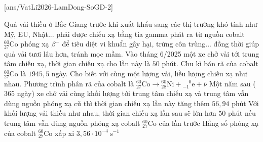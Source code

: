 	\subsection*{}
	\setcounter{ex}{0}
	[ans/VatLi2026-LamDong-SoGD-2]

	\begin{ex}%
		Quả vải thiều ở Bắc Giang trước khi xuất khẩu sang các thị trường khó tính như Mỹ, EU, Nhật... phải được chiếu xạ bằng tia gamma phát ra từ nguồn cobalt ${}^{60}_{27}\text{Co}$ phóng xạ $\beta^-$ để tiêu diệt vi khuẩn gây hại, trứng côn trùng... đồng thời giúp quả vải tươi lâu hơn, tránh mọc mầm. Vào tháng 6/2025 một xe chở vải tới trung tâm chiếu xạ, thời gian chiếu xạ cho lần này là $50$ phút. Chu kì bán rã của cobalt ${}^{60}_{27}\text{Co}$ là $1945{,}5$ ngày. Cho biết với cùng một lượng vải, liều lượng chiếu xạ như nhau.
		\choiceTFt
		{\True Phương trình phân rã của cobalt là ${}^{60}_{27}\text{Co}\to{}^{60}_{28}\text{Ni}+{}^{\phantom{-}0}_{-1}\text{e}+\overline{\nu}$}
		{Một năm sau ($365$ ngày) xe chở vải cùng khối lượng tới trung tâm chiếu xạ và trung tâm vẫn dùng nguồn phóng xạ cũ thì thời gian chiếu xạ lần này tăng thêm $56{,}94$ phút}
		{\True Với khối lượng vải thiều như nhau, thời gian chiếu xạ lần sau sẽ lớn hơn $50$ phút nếu trung tâm vẫn dùng nguồn phóng xạ cobalt ${}^{60}_{27}\text{Co}$ của lần trước}
		{Hằng số phóng xạ của cobalt ${}^{60}_{27}\text{Co}$ xấp xỉ $3{,}56\cdot 10^{-4}~\text{s}^{-1}$}
	\end{ex}


